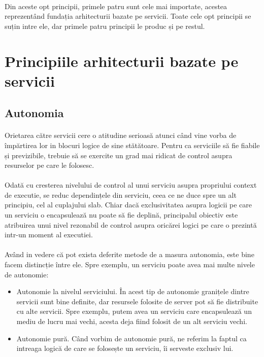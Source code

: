 \documentclass[12pt]{report}
\begin{document}
	\paragraph{}Din aceste opt principii, primele patru sunt cele mai importate, acestea reprezentând fundația arhitecturii bazate pe servicii. Toate cele opt principii se suțin intre ele, dar primele patru principii le produc și pe restul.
  	\section{Principiile arhitecturii bazate pe servicii}
  	\subsection{Autonomia}
  	\paragraph{}Orietarea către servicii cere o atitudine serioasă atunci când vine vorba de împărtirea lor in blocuri logice de sine stătătoare. Pentru ca serviciile să fie fiabile și previzibile, trebuie să se exercite un grad mai ridicat de control asupra resurselor pe care le folosesc.
  	\paragraph{}Odată cu cresterea nivelului de control al unui serviciu asupra propriului context de executie, se reduc dependințele din serviciu, ceea ce ne duce spre un alt principiu, cel al cuplajului slab. Chiar dacă exclusivitatea asupra logicii pe care un serviciu o encapsulează nu poate să fie deplină, principalul obiectiv este atribuirea unui nivel rezonabil de control asupra oricărei logici pe care o prezintă intr-un moment al executiei.\cite{erl4}
  	\paragraph{}Având in vedere că pot exista deferite metode de a masura autonomia, este bine facem distincție între ele. Spre exemplu, un serviciu poate avea mai multe nivele de autonomie:
    \begin{itemize}
    \item Autonomie la nivelul serviciului. În acest tip de autonomie granițele dintre servicii sunt bine definite, dar resursele folosite de server pot să fie distribuite cu alte servicii. Spre exemplu, putem avea un serviciu care encapsulează un mediu de lucru mai vechi, acesta deja fiind folosit de un alt serviciu vechi.
    \item Autonomie pură. Când vorbim de autonomie pură, ne referim la faptul ca intreaga logică de care se folosește un serviciu, îi serveste exclusiv lui. 
    \end{itemize}
\end{document}
